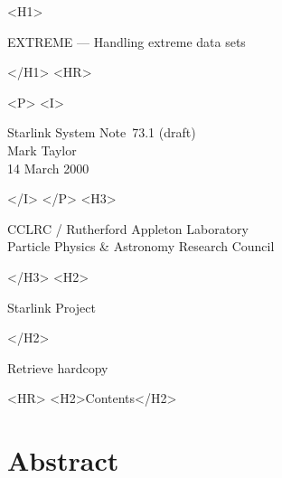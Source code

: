 \documentclass[twoside,11pt]{article}
\newcommand{\stardoccategory}  {Starlink System Note}
\newcommand{\stardocsource}    {ssn\stardocnumber}
\newcommand{\stardocnumber}    {73.1 (draft)}
\newcommand{\stardocauthors}   {Mark Taylor}
\newcommand{\stardocdate}      {14 March 2000}
\newcommand{\stardoctitle}     {EXTREME --- Handling extreme data sets}
\newcommand{\htmladdnormallink}[2]{#1}
\newcommand{\htmladdimg}[1]{}
\newcommand{\htmlref}[2]{#1}
\newcommand{\htmladdtonavigation}[1]{}
\newcommand{\xlabel}[1]{}
\renewcommand{\_}{\texttt{\symbol{95}}}
\begin{document}
\begin{htmlonly}
   \xlabel{}
   \begin{rawhtml} <H1> \end{rawhtml}
      \stardoctitle
   \begin{rawhtml} </H1> <HR> \end{rawhtml}

   \begin{rawhtml} <P> <I> \end{rawhtml}
   \stardoccategory\ \stardocnumber \\
   \stardocauthors \\
   \stardocdate
   \begin{rawhtml} </I> </P> <H3> \end{rawhtml}
      \htmladdnormallink{CCLRC / Rutherford Appleton Laboratory}
                        {http://www.cclrc.ac.uk} \\
      \htmladdnormallink{Particle Physics \& Astronomy Research Council}
                        {http://www.pparc.ac.uk} \\
   \begin{rawhtml} </H3> <H2> \end{rawhtml}
      \htmladdnormallink{Starlink Project}{http://www.starlink.rl.ac.uk/}
   \begin{rawhtml} </H2> \end{rawhtml}
   \htmladdnormallink{\htmladdimg{source.gif} Retrieve hardcopy}
      {http://www.starlink.rl.ac.uk/cgi-bin/hcserver?\stardocsource}\\

  \label{stardoccontents}
  \begin{rawhtml} 
    <HR>
    <H2>Contents</H2>
  \end{rawhtml}
  \htmladdtonavigation{\htmlref{\htmladdimg{contents_motif.gif}}
        {stardoccontents}}

  \section{\xlabel{abstract}Abstract}

\end{htmlonly}
\end{document}
